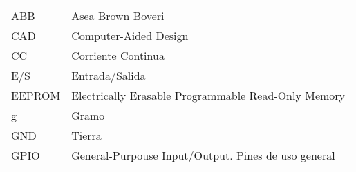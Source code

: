 \chapter*{\notationname}
\pagestyle{especial}
\chaptermark{\notationname}
{}
\begin{longtable}{p{3cm}p{8.5cm}}

ABB & Asea Brown Boveri \\
CAD & Computer-Aided Design \\
CC & Corriente Continua \\
E/S & Entrada/Salida \\
EEPROM & Electrically Erasable Programmable Read-Only Memory\\
g & Gramo \\
GND & Tierra \\
GPIO & General-Purpouse Input/Output. Pines de uso general \\

\end{longtable}
